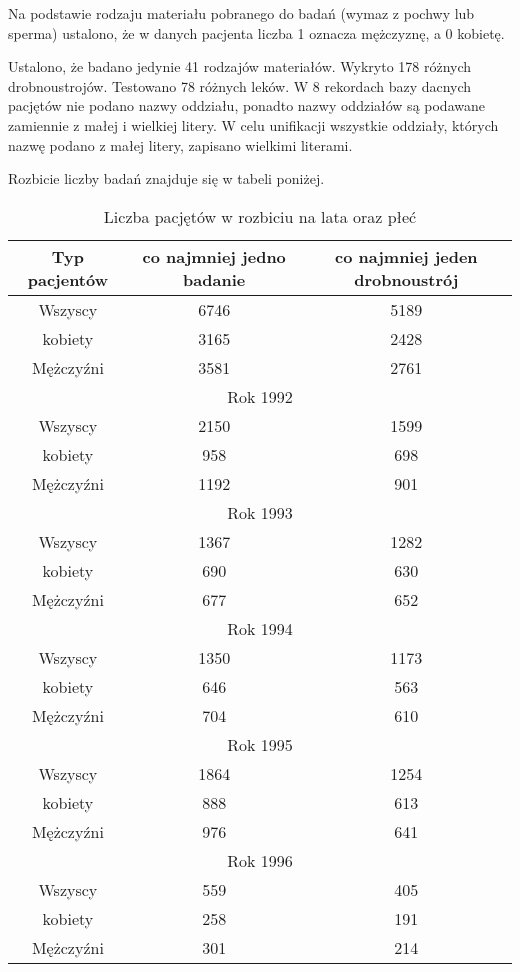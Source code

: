 \documentclass[a4paper,11pt]{article}
\begin{document}
Na podstawie rodzaju materiału pobranego do badań (wymaz z pochwy lub sperma) ustalono, że w danych pacjenta liczba 1 oznacza mężczyznę, a 0 kobietę.

Ustalono, że badano jedynie 41 rodzajów materiałów. Wykryto 178 różnych drobnoustrojów. Testowano 78 różnych leków.
W 8 rekordach bazy dacnych pacjętów nie podano nazwy oddziału, ponadto nazwy oddziałów są podawane zamiennie z małej i wielkiej litery.
W celu unifikacji wszystkie oddziały, których nazwę podano z małej litery, zapisano wielkimi literami.

Rozbicie liczby badań znajduje się w tabeli poniżej. 

\begin{table}[H]
\begin{center}
\caption{Liczba pacjętów w rozbiciu na lata oraz płeć}
\begin{tabular}{|c|c|c|}
\hline
Typ pacjentów &  co najmniej jedno badanie & co najmniej jeden drobnoustrój \\
\hline
Wszyscy & 6746 &5189\\
kobiety  & 3165  & 2428\\
Mężczyźni & 3581 & 2761\\ \hline
\multicolumn{3}{|c|}{Rok 1992} \\ \hline
Wszyscy & 2150 &1599\\
kobiety  & 958  & 698\\
Mężczyźni & 1192 & 901\\ \hline
\multicolumn{3}{|c|}{Rok 1993} \\ \hline
Wszyscy & 1367 &1282\\
kobiety  & 690  & 630\\
Mężczyźni & 677 & 652\\ \hline
\multicolumn{3}{|c|}{Rok 1994} \\ \hline
Wszyscy & 1350 &1173\\
kobiety  & 646  & 563\\
Mężczyźni & 704 & 610\\ \hline
\multicolumn{3}{|c|}{Rok 1995} \\ \hline
Wszyscy & 1864 &1254\\
kobiety  & 888  & 613\\
Mężczyźni & 976 & 641\\ \hline
\multicolumn{3}{|c|}{Rok 1996} \\ \hline
Wszyscy & 559 &405\\
kobiety  & 258  & 191\\
Mężczyźni & 301 & 214\\ \hline
\hline
\end{tabular}
\end{center}
\end{table}
\end{document}
